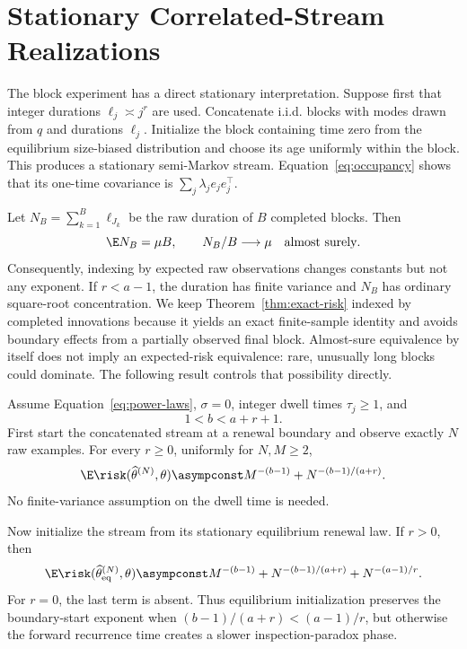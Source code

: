 \section{Stationary Correlated-Stream Realizations}

The block experiment has a direct stationary interpretation. Suppose first
that integer durations $\ell_j\asymp j^r$ are used. Concatenate i.i.d. blocks
with modes drawn from $q$ and durations $\ell_j$. Initialize the block
containing time zero from the equilibrium size-biased distribution and choose
its age uniformly within the block. This produces a stationary semi-Markov
stream. Equation~\eqref{eq:occupancy} shows that its one-time covariance is
$\sum_j\lambda_je_je_j^\top$.

Let $N_B=\sum_{k=1}^B\ell_{J_k}$ be the raw duration of $B$ completed blocks.
Then
\begin{equation}
\E N_B=\mu B,
\qquad
N_B/B\longrightarrow\mu\quad\text{almost surely}.
\label{eq:renewal-slln}
\end{equation}
Consequently, indexing by expected raw observations changes constants but not
any exponent. If $r<a-1$, the duration has finite variance and $N_B$ has
ordinary square-root concentration. We keep Theorem~\ref{thm:exact-risk}
indexed by completed innovations because it yields an exact finite-sample
identity and avoids boundary effects from a partially observed final block.
Almost-sure equivalence by itself does not imply an expected-risk equivalence:
rare, unusually long blocks could dominate. The following result controls that
possibility directly.

\begin{theorem}
\label{thm:raw-horizon}
Assume Equation~\eqref{eq:power-laws}, $\sigma=0$, integer dwell times
$\tau_j\ge1$, and
\begin{equation}
1<b<a+r+1.
\label{eq:raw-horizon-conditions}
\end{equation}
First start the concatenated stream at a renewal boundary and observe exactly
$N$ raw examples.  For every $r\ge0$, uniformly for $N,M\ge2$,
\begin{equation}
\E\risk(\widehat\theta^{(N)},\theta)
\asympconst
M^{-(b-1)}+N^{-(b-1)/(a+r)}.
\label{eq:raw-horizon-rate}
\end{equation}
No finite-variance assumption on the dwell time is needed.

Now initialize the stream from its stationary equilibrium renewal law.  If
$r>0$, then
\begin{equation}
\E\risk(\widehat\theta^{(N)}_{\rm eq},\theta)
\asympconst
M^{-(b-1)}+N^{-(b-1)/(a+r)}+N^{-(a-1)/r}.
\label{eq:stationary-raw-rate}
\end{equation}
For $r=0$, the last term is absent.  Thus equilibrium initialization preserves
the boundary-start exponent when $(b-1)/(a+r)<(a-1)/r$, but otherwise the
forward recurrence time creates a slower inspection-paradox phase.
\end{theorem}

